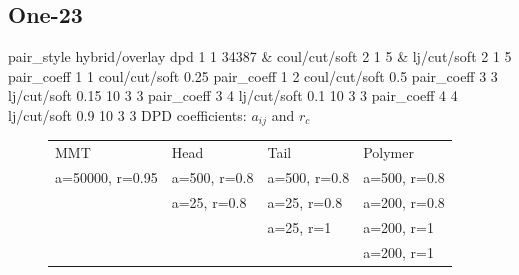 \documentclass[a4paper]{article}
\begin{document}
\subsection*{One-23}
pair\_style hybrid/overlay dpd 1 1 34387 \& coul/cut/soft 2 1 5 \& 
lj/cut/soft 2 1 5\newline
pair\_coeff 1 1 coul/cut/soft 0.25
pair\_coeff 1 2 coul/cut/soft 0.5\newline
pair\_coeff 3 3 lj/cut/soft 0.15 10 3 3\newline
pair\_coeff 3 4 lj/cut/soft 0.1  10 3 3\newline
pair\_coeff 4 4 lj/cut/soft 0.9  10 3 3\newline
DPD coefficients: $a_{ij}$ and $r_c$
\begin{figure}[H]\begin{tabular}{llll}
MMT             & Head         & Tail         & Polymer      \\
a=50000, r=0.95 & a=500, r=0.8 & a=500, r=0.8 & a=500, r=0.8 \\
                & a=25,  r=0.8 & a=25,  r=0.8 & a=200, r=0.8 \\
                &              & a=25,  r=1   & a=200, r=1   \\
                &              &              & a=200, r=1   \\
\end{tabular}\end{figure}
\end{document}
